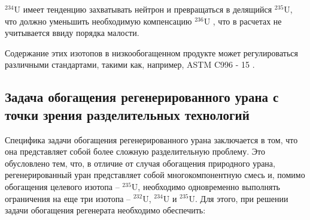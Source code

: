 $^{234}$U имеет тенденцию захватывать нейтрон и превращаться в делящийся $^{235}$U, что должно уменьшить необходимую компенсацию $^{236}$U \cite{dyachenkoIspolzovanieRegenerirovannogoUrana2012}, что в расчетах не учитывается ввиду порядка малости.

Содержание этих изотопов в низкообогащенном продукте может регулироваться различными стандартами, такими как, например, ASTM C996 - 15 \cite{c26committeeSpecificationUraniumHexafluoride}.

\subsection{Задача обогащения регенерированного урана с точки зрения разделительных технологий}

Специфика задачи обогащения регенерированного урана заключается в том, что она представляет собой более сложную разделительную проблему.
Это обусловлено тем, что, в отличие от случая обогащения природного урана, регенерированный уран представляет собой многокомпонентную смесь и, помимо обогащения целевого изотопа -- $^{235}$U, необходимо одновременно выполнять ограничения на еще три изотопа -- $^{232}$U, $^{234}$U и $^{235}$U.
Для этого, при решении задачи обогащения регенерата необходимо обеспечить:
